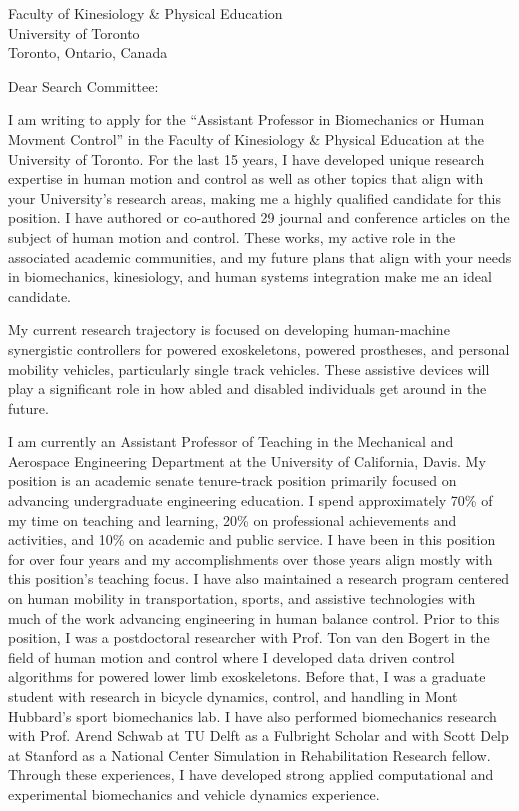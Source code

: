 \documentclass{letter}
\date{}
\begin{document}
\begin{letter}{
  Faculty of Kinesiology \& Physical Education \\
  University of Toronto \\
  Toronto, Ontario, Canada
}

\opening{Dear Search Committee:}

I am writing to apply for the ``Assistant Professor in Biomechanics or Human
Movment Control'' in the Faculty of Kinesiology \& Physical Education at the
University of Toronto. For the last 15 years, I have developed unique research
expertise in human motion and control as well as other topics that align with
your University's research areas, making me a highly qualified candidate for
this position. I have authored or co-authored 29 journal and conference
articles on the subject of human motion and control. These works, my active
role in the associated academic communities, and my future plans that align
with your needs in biomechanics, kinesiology, and human systems integration
make me an ideal candidate.

My current research trajectory is focused on developing human-machine
synergistic controllers for powered exoskeletons, powered prostheses, and
personal mobility vehicles, particularly single track vehicles. These assistive
devices will play a significant role in how abled and disabled individuals get
around in the future.

I am currently an Assistant Professor of Teaching in the Mechanical and
Aerospace Engineering Department at the University of California, Davis. My
position is an academic senate tenure-track position primarily focused on
advancing undergraduate engineering education. I spend approximately 70\% of my
time on teaching and learning, 20\% on professional achievements and
activities, and 10\% on academic and public service. I have been in this
position for over four years and my accomplishments over those years align
mostly with this position's teaching focus. I have also maintained a research
program centered on human mobility in transportation, sports, and assistive
technologies with much of the work advancing engineering in human balance
control. Prior to this position, I was a postdoctoral researcher with Prof. Ton
van den Bogert in the field of human motion and control where I developed data
driven control algorithms for powered lower limb exoskeletons. Before that, I
was a graduate student with research in bicycle dynamics, control, and handling
in Mont Hubbard's sport biomechanics lab. I have also performed biomechanics
research with Prof. Arend Schwab at TU Delft as a Fulbright Scholar and with
Scott Delp at Stanford as a National Center Simulation in Rehabilitation
Research fellow. Through these experiences, I have developed strong applied
computational and experimental biomechanics and vehicle dynamics experience.


\end{letter}
\end{document}
